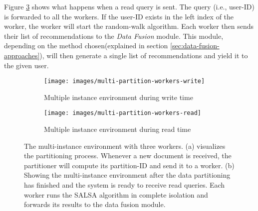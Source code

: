 Figure \ref{fig:multiple-machine-architecture-read} shows what happens when a read query is sent. The query (i.e., user-ID) is forwarded to all the workers. If the user-ID exists in the left index of the worker, the worker will start the random-walk algorithm. Each worker then sends their list of recommendations to the \emph{Data Fusion} module. This module, depending on the method chosen(explained in section \ref{sec:data-fusion-approaches}), will then generate a single list of recommendations and yield it to the given user.



\begin{figure}[!htb]
    \centering
    \begin{subfigure}[b]{0.75\textwidth}
        \centering
        \texttt{[image: images/multi-partition-workers-write]}
        \caption{Multiple instance environment during write time}
        \label{fig:multiple-machine-architecture-write}
    \end{subfigure}
    
    \begin{subfigure}[b]{1\textwidth}
        \centering
        \texttt{[image: images/multi-partition-workers-read]}
        \caption{Multiple instance environment during read time}
        \label{fig:multiple-machine-architecture-read}
    \end{subfigure}
    
    \caption {The multi-instance environment with three workers. (a) visualizes the partitioning process. Whenever a new document is received, the partitioner will compute its partition-ID and send it to a worker. (b) Showing the multi-instance environment after the data partitioning has finished and the system is ready to receive read queries. Each worker runs the SALSA algorithm in complete isolation and forwards its results to the data fusion module.}
\end{figure}
